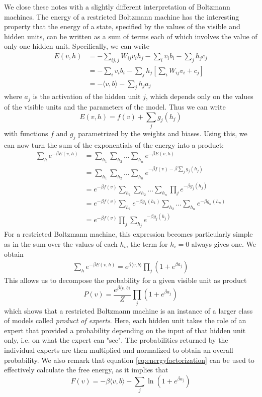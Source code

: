 \documentclass[a4paper, draft]{article}
\theoremstyle{own}
\theoremstyle{remark}
\begin{document}
We close these notes with a slightly different interpretation of Boltzmann machines. The energy of a restricted Boltzmann machine has the interesting property that the energy of a state, specified by the values of the visible and hidden units, can be written as a sum of terms each of which involves the value of only one hidden unit. Specifically, we can write
\begin{align*}
E(v,h) &= - \sum_{ij,j} W_{ij} v_i h_j - \sum_i v_i b_i - \sum_j h_j c_j \\
&= - \sum_i v_i b_i - \sum_j h_j \left[ \sum_i W_{ij} v_i + c_j \right] \\
&= - \langle v,b \rangle - \sum_j h_j a_j
\end{align*}
where $a_j$ is the activation of the hidden unit $j$, which depends only on the values of the visible units and the parameters of the model. Thus we can write
$$
E(v,h) = f(v) + \sum_j g_j(h_j)
$$
with functions $f$ and $g_j$ parametrized by the weights and biases. Using this, we can now turn the sum of the exponentials of the energy into a product:
\begin{align*}
\sum_h e^{-\beta E(v,h)} &= \sum_{h_1} \sum_{h_2} \dots \sum_{h_n} e^{-\beta E(v,h)} \\&= \sum_{h_1} \sum_{h_2} \dots \sum_{h_n} e^{-\beta f(v) - \beta \sum_j g_j(h_j)} \\
&= e^{-\beta f(v)} \sum_{h_1} \sum_{h_2} \dots \sum_{h_n} \prod_j e^{-\beta  g_j(h_j)} \\
&= e^{-\beta f(v)} \sum_{h_1} e^{-\beta  g_1(h_1)} \sum_{h_2} 
\dots \sum_{h_n} e^{-\beta  g_n(h_n)} \\
&= e^{-\beta f(v)} \prod_j \sum_{h_j} e^{-\beta  g_j(h_j)}
\end{align*}
For a restricted Boltzmann machine, this expression becomes particularly simple as in the sum over the values of each $h_i$, the term for $h_i = 0$ always gives one. We obtain
\begin{align}\label{eq:energyfactorization}
\sum_h e^{-\beta E(v,h)} = e^{\beta \langle v,b \rangle}
\prod_j (1 + e^{\beta a_j})
\end{align}
This allows us to decompose the probability for a given visible unit as product
$$
P(v) = \frac{e^{\beta \langle v,b \rangle}}{Z} \prod_j (1 + e^{\beta a_j})
$$
which shows that a restricted Boltzmann machine is an instance of a larger class of models called {\em product of experts}. Here, each hidden unit takes the role of an expert that provided a probability depending on the input of that hidden unit only, i.e. on what the expert can "see". The probabilities returned by the individual experts are then multiplied and normalized to obtain an overall probability. We also remark that equation \ref{eq:energyfactorization} can be used to effectively calculate the free energy, as it implies that
$$
F(v) = - \beta \langle v, b \rangle - \sum_j \ln (1 + e^{\beta a_j})
$$
\end{document}
